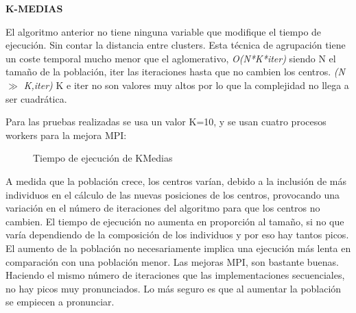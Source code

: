 \color{black}


\newpage
\textbf{K-MEDIAS}

El algoritmo anterior no tiene ninguna variable que modifique el tiempo de ejecución. Sin contar la distancia entre clusters. Esta técnica de agrupación tiene un coste temporal mucho menor que el aglomerativo, \textit{O(N*K*iter)} siendo N el tamaño de la población, iter las iteraciones  hasta que no cambien los centros. \textit{(N $\gg$ K,iter)} K e iter no son valores muy altos por lo que la complejidad no llega a ser cuadrática.

Para las pruebas realizadas se usa un valor K=10, y se usan cuatro procesos workers para la mejora MPI:


\begin{figure}[!h]
	\centering
	\caption{Tiempo de ejecución de KMedias}
\end{figure}


A medida que la población crece, los centros varían, debido a la inclusión de más individuos en el cálculo de las nuevas posiciones de los centros, provocando una variación en el número de iteraciones del algoritmo para que los centros no cambien. 
El tiempo de ejecución no aumenta en proporción al tamaño, si no que varía dependiendo de la composición de los individuos y por eso hay tantos picos. El aumento de la población no necesariamente implica una ejecución más lenta en comparación con una población menor.
Las mejoras MPI, son bastante buenas. Haciendo el mismo número de iteraciones que las implementaciones secuenciales, no hay picos muy pronunciados. Lo más seguro es que al aumentar la población se empiecen a pronunciar.





